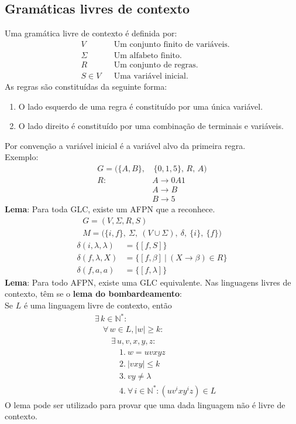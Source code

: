 \documentclass[11pt]{article}
\begin{document}
\subsection{Gramáticas livres de contexto}
\label{sec:org68d324c}
Uma gramática livre de contexto é definida por:
\begin{align*}
  & V && \text{Um conjunto finito de variáveis.} \\
  & \Sigma && \text{Um alfabeto finito.} \\
  & R && \text{Um conjunto de regras.} \\
  & S \in V && \text{Uma variável inicial.}
\end{align*}
As regras são constituídas da seguinte forma:
\begin{enumerate}
\item O lado esquerdo de uma regra é constituído por uma única variável.
\item O lado direito é constituído por uma combinação de terminais e variáveis.
\end{enumerate}
Por convenção a variável inicial é a variável alvo da primeira regra. \vspace{5pt} \\
Exemplo:
\begin{align*}
  G = \big(\{A, B\}, & \, \{0, 1, 5\},\, R,\, A \big) \\
  R: \quad & A \to 0A1 \\
           & A \to B \\
           & B \to 5
\end{align*}
\textbf{Lema}: Para toda GLC, existe um AFPN que a reconhece.
\begin{align*}
  & G = (V, \Sigma, R, S) & \\
  & M = \big( \{i, f\},\> \Sigma,\> (V \cup \Sigma),\> \delta,\> \{i\},\> \{f\} \big)
\end{align*}
\begin{align*}
  \delta(i, \lambda, \lambda) & = \big\{ [f, S] \big\} \\
  \delta(f, \lambda, X) & = \big\{ [f, \beta] \>\big|\> (X \to \beta) \in R \big\} \\
  \delta(f, a, a) & = \big\{ [f, \lambda] \big\}
\end{align*}
\textbf{Lema}: Para todo AFPN, existe uma GLC equivalente. \newpage
Nas linguagens livres de contexto, têm se o \textbf{lema do bombardeamento}: \\
Se \(L\) é uma linguagem livre de contexto, então
\begin{align*}
  & \exists\, k \in \mathbb{N}^*: \\
  & \quad \forall\, w \in L, |w| \geq k : \\
  & \quad\quad \exists\, u, v, x, y, z: \\
  & \quad\quad\quad 1.\> w = uvxyz \\
  & \quad\quad\quad 2.\> |vxy| \leq k \\
  & \quad\quad\quad 3.\> vy \neq \lambda \\
  & \quad\quad\quad 4.\> \forall\,i \in \mathbb{N}^*: \left(uv^ixy^iz\right) \in L
\end{align*}
O lema pode ser utilizado para provar que uma dada linguagem não é livre de contexto.
\end{document}
